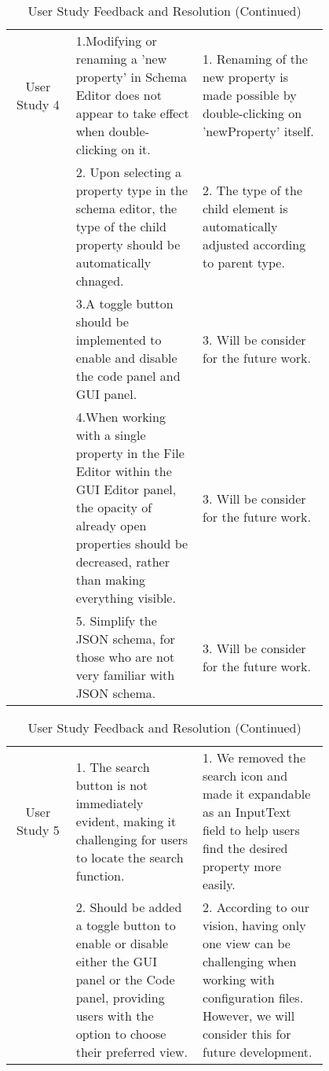 \begin{table*}

    \centering
    \small %
    \setlength{\extrarowheight}{5pt} %
    \renewcommand{\arraystretch}{1.5} %
    \begin{tabular}{|c|p{0.4\linewidth}|p{0.4\linewidth}|}
        \hline
        User Study 4 & 1.Modifying or renaming a 'new property' in Schema Editor does not appear to take effect when double-clicking on it. & 1. Renaming of the new property is made possible by double-clicking on 'newProperty' itself. \\
        \cline{2-3}
        & 2. Upon selecting a property type in the schema editor, the type of the child property should be automatically chnaged. & 2. The type of the child element is automatically adjusted according to parent type. \\
        \cline{2-3}
        & 3.A toggle button should be implemented to enable and disable the code panel and GUI panel. & 3. Will be consider for the future work. \\
        \cline{2-3}
        & 4.When working with a single property in the File Editor within the GUI Editor panel, the opacity of already open properties should be decreased, rather than making everything visible. & 3. Will be consider for the future work. \\
        \cline{2-3}
        & 5. Simplify the JSON schema, for those who are not very familiar with JSON schema. & 3. Will be consider for the future work. \\
        \hline

    \end{tabular}
    \caption{User Study Feedback and Resolution (Continued)}
\end{table*}

\begin{table*}

    \centering
    \small %
    \setlength{\extrarowheight}{5pt} %
    \renewcommand{\arraystretch}{1.5} %
    \begin{tabular}{|c|p{0.4\linewidth}|p{0.4\linewidth}|}
        \hline
        User Study 5 & 1. The search button is not immediately evident, making it challenging for users to locate the search function. & 1. We removed the search icon and made it expandable as an InputText field to help users find the desired property more easily. \\
        \cline{2-3}
        & 2. Should be added a toggle button to enable or disable either the GUI panel or the Code panel, providing users with the option to choose their preferred view. & 2. According to our vision, having only one view can be challenging when working with configuration files. However, we will consider this for future development. \\
        \hline

    \end{tabular}
    \caption{User Study Feedback and Resolution (Continued)}
\end{table*}



